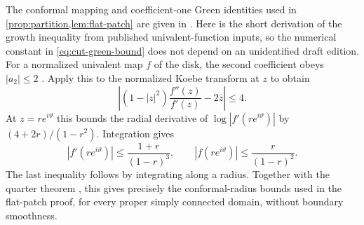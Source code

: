 The conformal mapping and coefficient-one Green identities used in
\cref{prop:partition,lem:flat-patch} are given in
\cite[Chapter~6, Sections~1.1 and~5.2]{Ahlfors1979}.
Here is the short derivation of the growth inequality from published
univalent-function inputs, so the numerical constant in
\cref{eq:cut-green-bound} does not depend on an unidentified draft
edition. For a normalized univalent map $f$ of the disk, the second
coefficient obeys $|a_2|\le2$
\cite[Equation~(2.68)]{AstalaIwaniecMartin2009}. Apply this to the
normalized Koebe transform at $z$ to obtain
\[
 \left|(1-|z|^2)\frac{f''(z)}{f'(z)}-2\overline z\right|\le4.
\]
At $z=re^{i\vartheta}$ this bounds the radial derivative of
$\log|f'(re^{i\vartheta})|$ by $(4+2r)/(1-r^2)$. Integration gives
\[
 |f'(re^{i\vartheta})|\le\frac{1+r}{(1-r)^3},
 \qquad |f(re^{i\vartheta})|\le\frac r{(1-r)^2}.
\]
The last inequality follows by integrating along a radius. Together
with the quarter theorem
\cite[Theorem~2.10.5]{AstalaIwaniecMartin2009}, this gives precisely
the conformal-radius bounds used in the flat-patch proof, for every
proper simply connected domain, without boundary smoothness.
